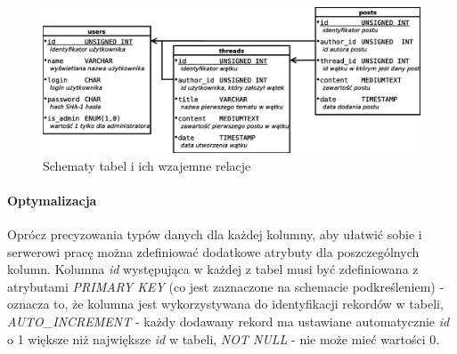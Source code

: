 \documentclass[a4paper,10pt]{article}
\begin{document}
\begin{figure}[htbp]
\centering
\includegraphics[width=1\textwidth]{db.eps}
\caption{Schematy tabel i ich wzajemne relacje}
\end{figure}

\paragraph{Optymalizacja}
Oprócz precyzowania typów danych dla każdej kolumny, aby ułatwić sobie i serwerowi pracę można zdefiniować dodatkowe atrybuty dla poszczególnych kolumn. Kolumna \textit{id} występująca w każdej z tabel musi być zdefiniowana z atrybutami \textit{PRIMARY KEY} (co jest zaznaczone na schemacie podkreśleniem) - oznacza to, że kolumna jest wykorzystywana do identyfikacji rekordów w tabeli, \textit{AUTO\_INCREMENT} - każdy dodawany rekord ma ustawiane automatycznie \textit{id} o 1 większe niż największe \textit{id} w tabeli, \textit{NOT NULL} - nie może mieć wartości 0.
\end{document}
